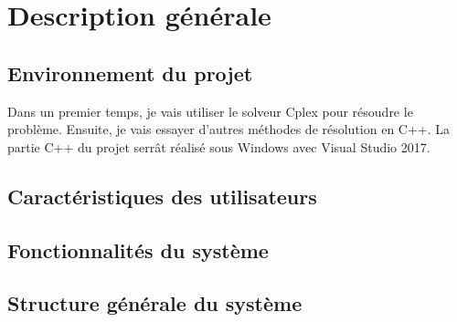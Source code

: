 \chapter{Description générale}

\section{Environnement du projet}
Dans un premier temps, je vais utiliser le solveur Cplex pour résoudre le problème.
Ensuite, je vais essayer d'autres méthodes de résolution en C++.
La partie C++ du projet serrât réalisé sous Windows avec Visual Studio 2017.
\section{Caractéristiques des utilisateurs}

\section{Fonctionnalités du système}

\section{Structure générale du système}